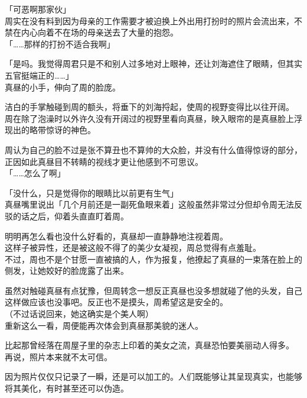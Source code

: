 「可恶啊那家伙」\\

周实在没有料到因为母亲的工作需要才被迫换上外出用打扮时的照片会流出来，不禁在内心向着不在场的母亲送去了大量的抱怨。\\

「……那样的打扮不适合我啊」

「是吗。我觉得周君只是不和别人过多地对上眼神，还让刘海遮住了眼睛，但其实五官挺端正的……」\\

真昼的小手，伸向了周的脸庞。

洁白的手掌触碰到周的额头，将垂下的刘海捋起，使周的视野变得比以往开阔。\\

周在除了泡澡时以外许久没有开阔过的视野里看向真昼，映入眼帘的是真昼脸上浮现出的略带惊讶的神色。

周认为自己的脸不过是张不算丑也不算帅的大众脸，并没有什么值得惊讶的部分，正因如此真昼目不转睛的视线才更让他感到不可思议。\\

「……怎么了啊」

「没什么，只是觉得你的眼睛比以前更有生气」\\

真昼嘴里说出「几个月前还是一副死鱼眼来着」这般虽然非常过分但却令周无法反驳的话之后，仰着头直直盯着周。

明明再怎么看也没什么好看的，真昼却一直静静地注视着周。\\

这样子被异性，还是被这般不得了的美少女凝视，周总觉得有点羞耻。\\

不过，周也不是个甘愿一直被搞的人，作为报复，他撩起了真昼的一束落在脸上的侧发，让她姣好的脸庞露了出来。

虽然对触碰真昼有点犹豫，但周转念一想反正真昼也没多想就碰了他的头发，自己这样做应该也没事吧。反正也不是摸头，周希望这是安全的。\\

（不过话说回来，她这确实是个美人啊）\\

重新这么一看，周便能再次体会到真昼那美貌的迷人。

比起那曾经落在周屋子里的杂志上印着的美女之流，真昼恐怕要美丽动人得多。\\

再说，照片本来就不太可信。

因为照片仅仅只记录了一瞬，还是可以加工的。人们既能够让其呈现真实，也能够将其美化，有时甚至还可以伪造。\\

